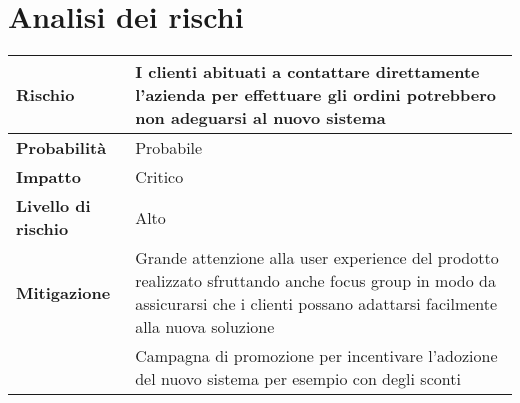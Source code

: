 \chapter{Analisi dei rischi}
\label{app:analisi-rischi}

\begin{table}[H]
  \begin{tabularx}{\textwidth}{lX}
    \toprule
    \textbf{Rischio}            & \textbf{I clienti abituati a contattare direttamente l'azienda per effettuare gli ordini potrebbero non adeguarsi al nuovo sistema}                                                \\
    \midrule
    \textbf{Probabilità}        & Probabile                                                                                                                                                                          \\
    \textbf{Impatto}            & Critico                                                                                                                                                                            \\
    \textbf{Livello di rischio} & Alto                                                                                                                                                                               \\
    \textbf{Mitigazione}        & Grande attenzione alla user experience del prodotto realizzato sfruttando anche focus group in modo da assicurarsi che i clienti possano adattarsi facilmente alla nuova soluzione \\
                                & Campagna di promozione per incentivare l'adozione del nuovo sistema per esempio con degli sconti                                                                                   \\
    \bottomrule
  \end{tabularx}
\end{table}

